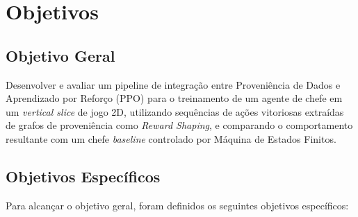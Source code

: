 \section{Objetivos}
\label{sec:objetivos}

\subsection{Objetivo Geral}
\label{subsec:objetivo-geral}

Desenvolver e avaliar um pipeline de integração entre Proveniência de Dados e
Aprendizado por Reforço (PPO) para o treinamento de um agente de chefe em um
\textit{vertical slice} de jogo 2D, utilizando sequências de ações vitoriosas
extraídas de grafos de proveniência como \textit{Reward Shaping}, e comparando
o comportamento resultante com um chefe \textit{baseline} controlado por
Máquina de Estados Finitos.

\subsection{Objetivos Específicos}
\label{subsec:objetivos-especificos}

Para alcançar o objetivo geral, foram definidos os seguintes objetivos
específicos:

